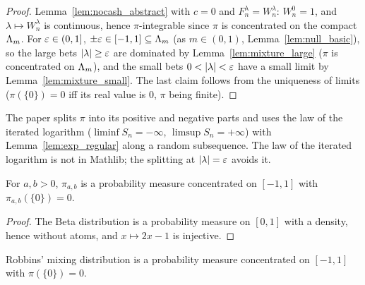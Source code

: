 \begin{proof}
  \leanok
  Lemma~\ref{lem:nocash_abstract} with $c = 0$ and $F^\lambda_n = W^\lambda_n$: $W^0_n = 1$, and
  $\lambda \mapsto W^\lambda_n$ is continuous, hence $\pi$-integrable since $\pi$ is concentrated on
  the compact $\Lambda_m$. For $\varepsilon \in (0, 1]$, $\pm\varepsilon \in [-1, 1] \subseteq \Lambda_m$ (as $m \in (0,1)$,
  Lemma~\ref{lem:null_basic}), so the large bets $\lvert \lambda \rvert \ge \varepsilon$ are dominated by
  Lemma~\ref{lem:mixture_large} ($\pi$ is concentrated on $\Lambda_m$), and the small bets $0 <
  \lvert \lambda \rvert < \varepsilon$ have a small limit by Lemma~\ref{lem:mixture_small}. The last claim follows
  from the uniqueness of limits ($\pi(\{0\}) = 0$ iff its real value is $0$, $\pi$ being finite).
\end{proof}

\begin{remark}
  The paper splits $\pi$ into its positive and negative parts and uses the law of the iterated
  logarithm ($\liminf S_n = -\infty$, $\limsup S_n = +\infty$) with Lemma~\ref{lem:exp_regular}
  along a random subsequence. The law of the iterated logarithm is not in Mathlib; the splitting at
  $\lvert \lambda \rvert = \varepsilon$ avoids it.
\end{remark}

\begin{lemma}
  \label{lem:betaMixture_prob}
  \leanok
  For $a, b > 0$, $\pi_{a,b}$ is a probability measure concentrated on $[-1,1]$ with
  $\pi_{a,b}(\{0\}) = 0$.
\end{lemma}

\begin{proof}
  \leanok
  The Beta distribution is a probability measure on $[0,1]$ with a density, hence without atoms,
  and $x \mapsto 2x - 1$ is injective.
\end{proof}

\begin{lemma}
  \label{lem:robbins_prob}
  \leanok
  Robbins' mixing distribution is a probability measure concentrated on $[-1,1]$ with
  $\pi(\{0\}) = 0$.
\end{lemma}

